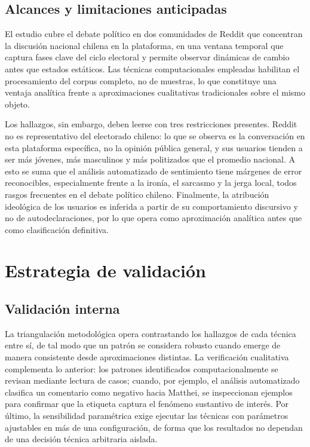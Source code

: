 \documentclass[
  letterpaper,
  numbers=noendperiod,
  fontsize=11pt,
  DIV=12,
  titlepage=false]{scrreprt}
\begin{document}
\subsection{Alcances y limitaciones
anticipadas}\label{alcances-y-limitaciones-anticipadas}

El estudio cubre el debate político en dos comunidades de Reddit que
concentran la discusión nacional chilena en la plataforma, en una
ventana temporal que captura fases clave del ciclo electoral y permite
observar dinámicas de cambio antes que estados estáticos. Las técnicas
computacionales empleadas habilitan el procesamiento del corpus
completo, no de muestras, lo que constituye una ventaja analítica frente
a aproximaciones cualitativas tradicionales sobre el mismo objeto.

Los hallazgos, sin embargo, deben leerse con tres restricciones
presentes. Reddit no es representativo del electorado chileno: lo que se
observa es la conversación en esta plataforma específica, no la opinión
pública general, y sus usuarios tienden a ser más jóvenes, más
masculinos y más politizados que el promedio nacional. A esto se suma
que el análisis automatizado de sentimiento tiene márgenes de error
reconocibles, especialmente frente a la ironía, el sarcasmo y la jerga
local, todos rasgos frecuentes en el debate político chileno.
Finalmente, la atribución ideológica de los usuarios es inferida a
partir de su comportamiento discursivo y no de autodeclaraciones, por lo
que opera como aproximación analítica antes que como clasificación
definitiva.

\section{Estrategia de validación}\label{estrategia-de-validaciuxf3n}

\subsection{Validación interna}\label{validaciuxf3n-interna}

La triangulación metodológica opera contrastando los hallazgos de cada
técnica entre sí, de tal modo que un patrón se considera robusto cuando
emerge de manera consistente desde aproximaciones distintas. La
verificación cualitativa complementa lo anterior: los patrones
identificados computacionalmente se revisan mediante lectura de casos;
cuando, por ejemplo, el análisis automatizado clasifica un comentario
como negativo hacia Matthei, se inspeccionan ejemplos para confirmar que
la etiqueta captura el fenómeno sustantivo de interés. Por último, la
sensibilidad paramétrica exige ejecutar las técnicas con parámetros
ajustables en más de una configuración, de forma que los resultados no
dependan de una decisión técnica arbitraria aislada.
\end{document}
